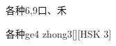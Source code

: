 \begin{entry}{各种}{6,9}{⼝、⽲}
  \begin{phonetics}{各种}{ge4 zhong3}[][HSK 3]
  \end{phonetics}
\end{entry}
